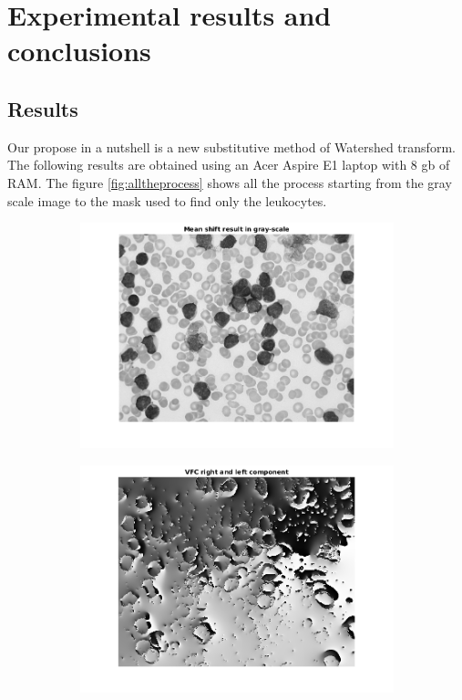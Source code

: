 \chapter{Experimental results and conclusions}
\section{Results}
Our propose in a nutshell is a new substitutive method of Watershed transform. The following results are obtained using an Acer Aspire E1 laptop with 8 gb of RAM. The figure \ref{fig:alltheprocess} shows all the process starting from the gray scale image to the mask used to find only the leukocytes.
\begin{figure}[htbp]
    \centering
    \begin{subfigure}[b]{0.45\textwidth}
        \includegraphics[width=\textwidth]{img/final/figure1.png}
        \caption{ }
        \label{fig:fig1}
    \end{subfigure}
    \begin{subfigure}[b]{0.45\textwidth}
        \includegraphics[width=\textwidth]{img/final/figure2.png}

\end{subfigure}
\end{figure}
